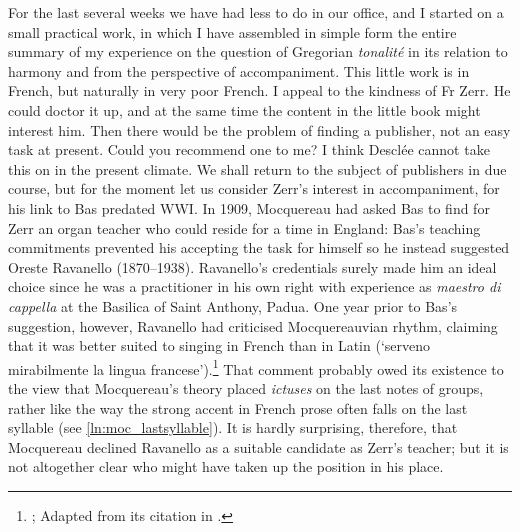   {}
{For the last several weeks we have had less to do in our office, and I started on a small practical work, in which I have assembled in simple form the entire summary of my experience on the question of Gregorian \emph{tonalité} in its relation to harmony and from the perspective of accompaniment. This little work is in French, but naturally in very poor French. I appeal to the kindness of Fr Zerr. He could doctor it up, and at the same time the content in the little book might interest him. Then there would be the problem of finding a publisher, not an easy task at present. Could you recommend one to me? I think Desclée cannot take this on in the present climate.}
\noindent
We shall return to the subject of publishers in due course, but for the moment let us consider Zerr's interest in accompaniment, for his link to Bas predated WWI.
In 1909, Mocquereau had asked Bas to find for Zerr an organ teacher who could reside for a time in England: Bas's teaching commitments prevented his accepting the task for himself so he instead suggested Oreste Ravanello (1870--1938).
Ravanello's credentials surely made him an ideal choice since he was a practitioner in his own right with experience as \emph{maestro di cappella} at the Basilica of Saint Anthony, Padua.
One year prior to Bas's suggestion, however, Ravanello had criticised Mocquereauvian rhythm, claiming that it was better suited to singing in French than in Latin (`serveno mirabilmente la lingua francese').\footnote{\covid{}\cite{RavanelloSullritmosull1908}; Adapted from its citation in \cite[56]{DelSordomonemicanellaccompagnamento2000}.}
That comment probably owed its existence to the view that Mocquereau's theory placed \emph{ictuses} on the last notes of groups, rather like the way the strong accent in French prose often falls on the last syllable (see \cref{ln:moc_lastsyllable}).
It is hardly surprising, therefore, that Mocquereau declined Ravanello as a suitable candidate as Zerr's teacher; but it is not altogether clear who might have taken up the position in his place.

